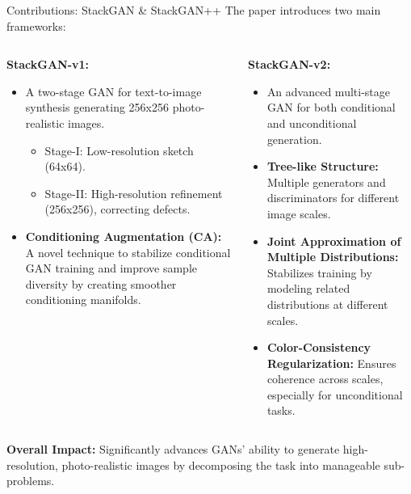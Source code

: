 \documentclass{beamer}
\begin{document}
\begin{frame}{Contributions: StackGAN \& StackGAN++}
    The paper introduces two main frameworks:
    \begin{columns}[T]
        \begin{column}{0.5\textwidth}
            \textbf{StackGAN-v1:}
            \begin{itemize}
                \item A two-stage GAN for text-to-image synthesis generating 256x256 photo-realistic images.
                    \begin{itemize}
                        \item Stage-I: Low-resolution sketch (64x64).
                        \item Stage-II: High-resolution refinement (256x256), correcting defects.
                    \end{itemize}
                \item \textbf{Conditioning Augmentation (CA):} A novel technique to stabilize conditional GAN training and improve sample diversity by creating smoother conditioning manifolds.
            \end{itemize}
        \end{column}
        \begin{column}{0.5\textwidth}
            \textbf{StackGAN-v2:}
            \begin{itemize}
                \item An advanced multi-stage GAN for both conditional and unconditional generation.
                \item \textbf{Tree-like Structure:} Multiple generators and discriminators for different image scales.
                \item \textbf{Joint Approximation of Multiple Distributions:} Stabilizes training by modeling related distributions at different scales.
                \item \textbf{Color-Consistency Regularization:} Ensures coherence across scales, especially for unconditional tasks.
            \end{itemize}
        \end{column}
    \end{columns}
    \vspace{0.3cm}
    \textbf{Overall Impact:} Significantly advances GANs' ability to generate high-resolution, photo-realistic images by decomposing the task into manageable sub-problems.
\end{frame}
\end{document}
